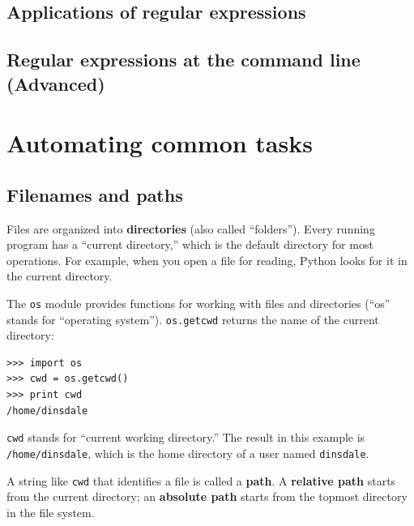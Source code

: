 \section{Applications of regular expressions}

\section{Regular expressions at the command line (Advanced)}


\chapter{Automating common tasks}


\section{Filenames and paths}
\label{paths}


Files are organized into {\bf directories} (also called ``folders'').
Every running program has a ``current directory,'' which is the
default directory for most operations.  
For example, when you open a file for reading, Python looks for it in the
current directory.


The {\tt os} module provides functions for working with files and
directories (``os'' stands for ``operating system'').  {\tt os.getcwd}
returns the name of the current directory:


\beforeverb
\begin{verbatim}
>>> import os
>>> cwd = os.getcwd()
>>> print cwd
/home/dinsdale
\end{verbatim}
\afterverb
%
{\tt cwd} stands for ``current working directory.''  The result in
this example is {\tt /home/dinsdale}, which is the home directory of a
user named {\tt dinsdale}.


A string like {\tt cwd} that identifies a file is called a {\bf path}.
A {\bf relative path} starts from the current directory;
an {\bf absolute path} starts from the topmost directory in the
file system.


